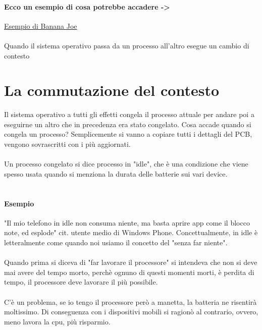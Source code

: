 \documentclass[12pt, a4paper, openany, twoside]{book}
\begin{document}
\paragraph{Ecco un esempio di cosa potrebbe accadere -> }
\href{https://www.youtube.com/watch?v=kDakHx2wt7I}{Esempio di Banana Joe}
\\ \\
Quando il sistema operativo passa da un processo all'altro esegue un cambio
di contesto 
\section{La commutazione del contesto}
Il sistema operativo a tutti gli effetti congela il processo attuale per andare
poi a eseguirne un altro che in precedenza era stato congelato. Cosa accade
quando si congela un processo? Semplicemente si vanno a copiare tutti i dettagli
del PCB, vengono sovrascritti con i più aggiornati. \\ \\
Un processo congelato si dice processo in "idle", che è una condizione che viene
spesso usata quando si menziona la durata delle batterie sui vari device. \\ \\
\paragraph{Esempio}
"Il mio telefono in idle non consuma niente, ma basta aprire app come il 
blocco note, ed esplode" cit. utente medio di Windows Phone. Concettualmente,
in idle è letteralmente come quando noi usiamo il concetto del "senza far 
niente".\\ \\
Quando prima si diceva di "far lavorare il processore" si intendeva che non 
si deve mai avere del tempo morto, perchè ognuno di questi momenti morti, è 
perdita di tempo, il processore deve lavorare il più possibile. \\ \\
C'è un problema, se io tengo il processore però a manetta, la batteria ne risentirà
moltissimo. Di conseguenza con i dispositivi mobili si ragionò al contrario, 
ovvero, meno lavora la cpu, più risparmio. \\ \\
\end{document}
